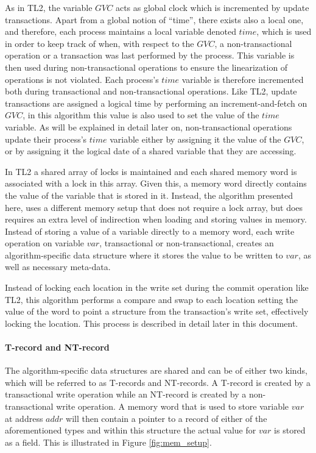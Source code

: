 \documentclass[11pt,letterpaper]{article}
\begin{document}
As in TL2,  the variable $\mathit{GVC}$
acts as  global  clock  which  is incremented  by update transactions.
 Apart from a global   notion of ``time'', there exists also
a local one, and therefore, each process maintains a local  
variable denoted $\mathit{time}$,  which is used in order to keep  
track of when, with
respect to the $\mathit{GVC}$, a non-transactional operation 
or a transaction was last performed by
the  process.
This variable is then used during non-transactional operations to ensure
the linearization of operations is not violated.
Each  process's  $\mathit{time}$   variable is   
therefore incremented
both during transactional and non-transactional operations.
Like TL2, update  transactions are assigned a logical time by
performing an increment-and-fetch
on  $\mathit{GVC}$, in this algorithm this value is also used to set the
value of the $\mathit{time}$ variable.  As  will  be explained  in  detail  later  on,
non-transactional operations update  
their process's $\mathit{time}$ variable either by  assigning it the value of 
the $\mathit{GVC}$, or by assigning it the  
logical date of a shared variable that they are accessing.

In TL2 a  shared array of locks is maintained and each
shared memory word  
is associated with a lock in this array. Given this, a memory
word directly contains  
the value of the variable that  is stored in it.
Instead, the algorithm presented here, uses
a  different memory setup that does not require a lock array, but does requires
an extra level of indirection when loading and storing values in memory.
Instead of storing a value of a variable directly to a memory word,
each  write  operation  on   variable  $\mathit{var}$,   transactional  or
non-transactional, creates an algorithm-specific data  
structure where  it stores  the value to  be written to  $\mathit{var}$, as
well as necessary meta-data.

Instead of locking each location in the write set during the commit operation like TL2, this algorithm
performs a compare and swap to each location setting the value of the word to point
a structure from the transaction's write set, effectively locking the location.
This process is described in detail later in this document.

\paragraph{T-record  and NT-record}
The  algorithm-specific  data structures  are shared  and  can be  of 
either  two  kinds, which will be referred   to as T-records and NT-records. 
A T-record is created by a transactional write operation while an 
NT-record is created by a  non-transactional write operation. A memory word
that is used to store  
variable $\mathit{var}$ at address $\mathit{addr}$ will then contain a pointer to a  
record of either of the  aforementioned types and within this structure
the actual value for  $\mathit{var}$ is stored as a field. 
This  is illustrated in Figure  \ref{fig:mem_setup}.
\end{document}
